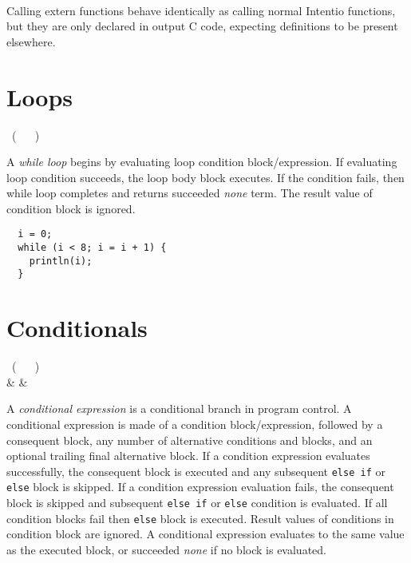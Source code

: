 \begin{bnf}
   \  \  \  \ \term{(} \  \ \term{)}
\end{bnf}

Calling extern functions behave identically as calling normal Intentio functions, but they are only declared in output C code, expecting definitions to be present elsewhere.

\section{Loops}

\begin{bnf}
   \eq {} \ ( \  \gor {} \ ) \ 
\end{bnf}

A \emph{while loop} begins by evaluating loop condition block/expression. If evaluating loop condition succeeds, the loop body block executes. If the condition fails, then while loop completes and returns succeeded \emph{none} term. The result value of condition block is ignored.

\begin{example}
\begin{lstlisting}
  i = 0;
  while (i < 8; i = i + 1) {
    println(i);
  }
\end{lstlisting}
\end{example}

\section{Conditionals}

\begin{bnf}
   \eq {} \ ( \  \gor {} \ ) \  \\
              & & 
\end{bnf}

A \emph{conditional expression} is a conditional branch in program control. A conditional expression is made of a condition block/expression, followed by a consequent block, any number of alternative conditions and blocks, and an optional trailing final alternative block. If a condition expression evaluates successfully, the consequent block is executed and any subsequent \lstinline{else if} or \lstinline{else} block is skipped. If a condition expression evaluation fails, the consequent block is skipped and subsequent \lstinline{else if} or \lstinline{else} condition is evaluated. If all condition blocks fail then \lstinline{else} block is executed. Result values of conditions in condition block are ignored. A conditional expression evaluates to the same value as the executed block, or succeeded \emph{none} if no block is evaluated.


